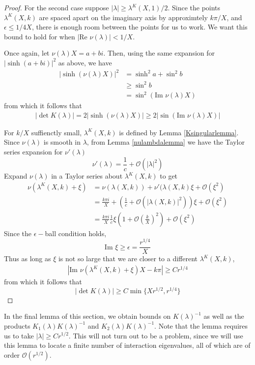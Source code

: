 \documentclass[thesis.tex]{subfiles}
\begin{document}
\begin{lemma}
\begin{proof}
For the second case suppose $|\lambda| \geq \lambda^K(X,1)/2$. Since the points $\lambda^K(X,k)$ are spaced apart on the imaginary axis by approximtely $k \pi/X$, and $\epsilon \leq 1/4X$, there is enough room between the points for us to work. We want this bound to hold for when $|\text{Re } \nu(\lambda)| < 1/X$. 

Once again, let $\nu(\lambda) X = a + b i$. Then, using the same expansion for $|\sinh(a + b i)|^2$ as above, we have
\begin{align*}
|\sinh(\nu(\lambda) X)|^2 
&= \sinh^2 a + \sin^2 b \\
&\geq \sin^2 b \\
&= \sin^2 (\text{Im }\nu(\lambda)X)
\end{align*}
from which it follows that
\begin{align*}
|\det K(\lambda)| = 2 |\sinh(\nu(\lambda) X)| \geq 2|\sin(\text{Im }\nu(\lambda)X)|
\end{align*}

For $k/X$ suffienctly small, $\lambda^K(X, k)$ is defined by Lemma \ref{Ksingularlemma}. Since $\nu(\lambda)$ is smooth in $\lambda$, from Lemma \ref{nulambdalemma} we have the Taylor series expansion for $\nu'(\lambda)$
\[
\nu'(\lambda) = \frac{1}{c} + \mathcal{O}(|\lambda|^2)
\]
Expand $\nu(\lambda)$ in a Taylor series about $\lambda^K(X, k)$ to get
\begin{align*}
\nu\left( \lambda^K(X, k) + \xi \right) &= \nu( \lambda(X, k) ) + \nu'(\lambda(X, k)\xi
+ \mathcal{O}(\xi^2) \\
&= \frac{k \pi i}{X} + \left( \frac{1}{c} + \mathcal{O}(|\lambda(X, k)|^2) \right) \xi
+ \mathcal{O}(\xi^2) \\
&= \frac{k \pi i}{X} \frac{1}{c}\xi \left( 1 + \mathcal{O} \left(\frac{k}{X}\right)^2 \right) + \mathcal{O}(\xi^2)
\end{align*}
Since the $\epsilon-$ball condition holds,
\[
\text{Im } \xi \geq \epsilon = \frac{r^{1/4}}{X}
\]
Thus as long as $\xi$ is not so large that we are closer to a different $\lambda^K(X, k)$,
\begin{align*}
|\text{Im } \nu\left( \lambda^K(X, k) + \xi \right)X - k \pi| \geq C r^{1/4}
\end{align*}
from which it follows that
\[
|\det K(\lambda)| \geq C \min\{ X r^{1/2}, r^{1/4} \}
\]
\end{proof}
\end{lemma}

In the final lemma of this section, we obtain bounds on $K(\lambda)^{-1}$ as well as the products $K_1(\lambda)K(\lambda)^{-1}$ and $K_2(\lambda)K(\lambda)^{-1}$. Note that the lemma requires us to take $|\lambda| \geq C r^{1/2}$. This will not turn out to be a problem, since we will use this lemma to locate a finite number of interaction eigenvalues, all of which are of order $\mathcal{O}(r^{1/2})$.
\end{document}
